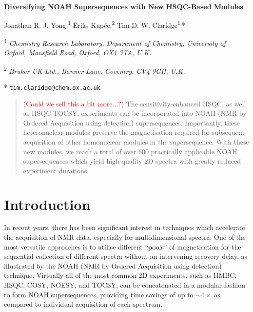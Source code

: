\documentclass[11pt]{article}
\newcommand*{\proton}{\ce{^{1}H}}
\newcommand*{\red}[1]{\textcolor{red}{#1}}
\begin{document}
\begin{center}
    \Large \textbf{Diversifying NOAH Supersequences with New HSQC-Based Modules}

    \vspace{0.2cm}

    \large Jonathan R. J. Yong,\textsuperscript{1} {\=E}riks Kup{\v{c}}e,\textsuperscript{2} Tim D. W. Claridge\textsuperscript{1,}*

    \vspace{0.2cm}

    \normalsize

    \textsuperscript{1} \textit{Chemistry Research Laboratory, Department of Chemistry, University of Oxford, Mansfield Road, Oxford, OX1 3TA, U.K.}

    \textsuperscript{2} \textit{Bruker UK Ltd., Banner Lane, Coventry, CV4 9GH, U.K.}

    * \texttt{tim.claridge@chem.ox.ac.uk}
\end{center}

\vspace{0.5cm}

\begin{abstract}
    \red{(Could we sell this a bit more...?)}
    The sensitivity-enhanced HSQC, as well as HSQC-TOCSY, experiments can be incorporated into NOAH (NMR by Ordered Acquisition using \proton{} detection) supersequences.
    Importantly, these heteronuclear modules preserve the magnetisation required for subsequent acquisition of other homonuclear modules in the supersequence.
    With these new modules, we reach a total of over 600 practically applicable NOAH supersequences which yield high-quality 2D spectra with greatly reduced experiment durations.
\end{abstract}

\section*{Introduction}

In recent years, there has been significant interest in techniques which accelerate the acquisition of NMR data, especially for multidimensional spectra.\autocite{ultrafast, timeshared, multireceive}
One of the most versatile approaches is to utilise different ``pools'' of magnetisation for the sequential collection of different spectra without an intervening recovery delay, as illustrated by the NOAH (NMR by Ordered Acquisition using \proton{} detection) technique.\autocite{noah}
Virtually all of the most common 2D experiments, such as HMBC, HSQC, COSY, NOESY, and TOCSY, can be concatenated in a modular fashion to form NOAH supersequences, providing time savings of up to $\sim 4\times$ as compared to individual acquisition of each spectrum.
\end{document}
